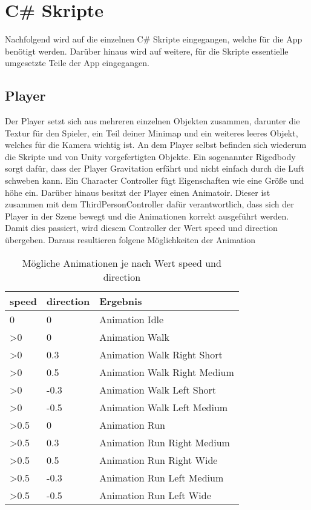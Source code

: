 \section{C\# Skripte}
	Nachfolgend wird auf die einzelnen C\# Skripte eingegangen, welche für die App benötigt werden. Darüber hinaus wird auf weitere, für die Skripte essentielle umgesetzte Teile der App eingegangen.

\subsection{Player}
	Der Player setzt sich aus mehreren einzelnen Objekten zusammen, darunter die Textur für den Spieler, ein Teil deiner Minimap und ein weiteres leeres Objekt, welches für die Kamera wichtig ist. An dem Player selbst befinden sich wiederum die Skripte und von Unity vorgefertigten Objekte. Ein sogenannter Rigedbody sorgt dafür, dass der Player Gravitation erfährt und nicht einfach durch die Luft schweben kann. Ein Character Controller fügt Eigenschaften wie eine Größe und höhe ein. Darüber hinaus besitzt der Player einen Animatoir. Dieser ist zusammen mit dem ThirdPersonController dafür verantwortlich, dass sich der Player in der Szene bewegt und die Animationen korrekt ausgeführt werden. Damit dies passiert, wird diesem Controller der Wert speed und direction übergeben. Daraus resultieren folgene Möglichkeiten der Animation

 \begin{table}[htpb]
 \begin{tabular}{|l|l|l|}
 \hline
  speed & direction & Ergebnis \\
 \hline
  0 & 0 & Animation Idle \\
  >0 & 0 & Animation Walk \\
  >0 & 0.3 & Animation Walk Right Short \\
  >0 & 0.5 & Animation Walk Right Medium \\
  >0 & -0.3 & Animation Walk Left Short \\
  >0 & -0.5 & Animation Walk Left Medium \\
  >0.5 & 0 & Animation Run \\
  >0.5 & 0.3 & Animation Run Right Medium \\
  >0.5 & 0.5 & Animation Run Right Wide \\
  >0.5 & -0.3 & Animation Run Left Medium \\
  >0.5 & -0.5 & Animation Run Left Wide \\ \hline
 \end{tabular}
  \caption{Mögliche Animationen je nach Wert speed und direction}
 \label{tab:tabspeeddirection}
 \end{table}
 
